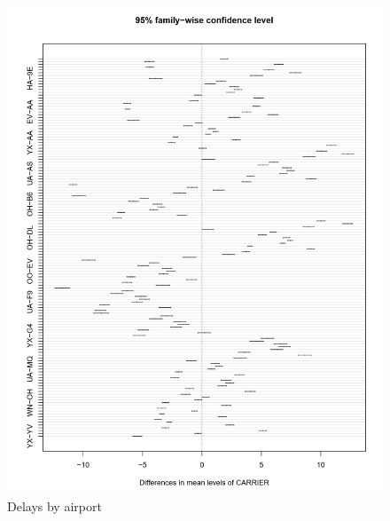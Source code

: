 \documentclass[12pt, a4paper, openany]{book}
\begin{document}
			\begin{figure}[h]
			\centering
	 		\includegraphics[width = 1 \textwidth]{../figures/PLOTS FOR REPORT/Chapter 4/Figure 4.7}
	 		\caption{Delays by airport}
	 		\end{figure}

\end{document}
